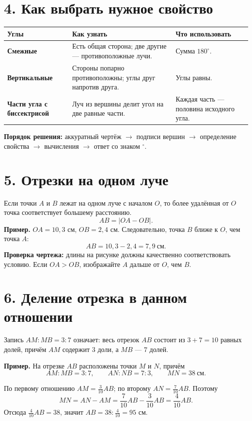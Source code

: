 \documentclass[a4paper,12pt]{article}
\newcommand{\headingrule}{\vspace{-0.45em}{\color{accent}\hrule height 0.55pt}\vspace{0.55em}}
\newcommand{\key}[1]{\textbf{\color{darkaccent}#1}}
\begin{document}
\section*{4. Как выбрать нужное свойство}
\headingrule
\begin{center}
\renewcommand{\arraystretch}{1.28}
\begin{tabularx}{\linewidth}{@{}>{\bfseries}p{36mm}X X@{}}
\toprule
Углы & Как узнать & Что использовать\\
\midrule
Смежные & Есть общая сторона; две другие --- противоположные лучи. & Сумма $180^\circ$.\\
Вертикальные & Стороны попарно противоположны; углы друг напротив друга. & Углы равны.\\
Части угла с биссектрисой & Луч из вершины делит угол на две равные части. & Каждая часть --- половина исходного угла.\\
\bottomrule
\end{tabularx}
\end{center}
\key{Порядок решения:} аккуратный чертёж $\rightarrow$ подписи вершин
$\rightarrow$ определение свойства $\rightarrow$ вычисления $\rightarrow$ ответ со знаком $^\circ$.

\clearpage
\section*{5. Отрезки на одном луче}
\headingrule
Если точки $A$ и $B$ лежат на одном луче с началом $O$, то более удалённая от $O$ точка соответствует большему расстоянию.
\[
AB=\bigl|OA-OB\bigr|.
\]
\textbf{Пример.} $OA=10{,}3$ см, $OB=2{,}4$ см. Следовательно, точка $B$ ближе к $O$, чем точка $A$:
\[
AB=10{,}3-2{,}4=7{,}9\ \text{см}.
\]
\key{Проверка чертежа:} длины на рисунке должны качественно соответствовать условию. Если $OA>OB$, изображайте $A$ дальше от $O$, чем $B$.

\section*{6. Деление отрезка в данном отношении}
\headingrule
Запись $AM:MB=3:7$ означает: весь отрезок $AB$ состоит из $3+7=10$ равных долей, причём $AM$ содержит $3$ доли, а $MB$ --- $7$ долей.

\textbf{Пример.} На отрезке $AB$ расположены точки $M$ и $N$, причём
\[
AM:MB=3:7,\qquad AN:NB=7:3,\qquad MN=38\ \text{см}.
\]
\begin{center}
\end{center}
По первому отношению $AM=\frac{3}{10}AB$; по второму $AN=\frac{7}{10}AB$.
Поэтому
\[
MN=AN-AM=\frac{7}{10}AB-\frac{3}{10}AB=\frac{4}{10}AB.
\]
Отсюда $\frac{4}{10}AB=38$, значит $AB=38:\frac{4}{10}=95$ см.
\end{document}
